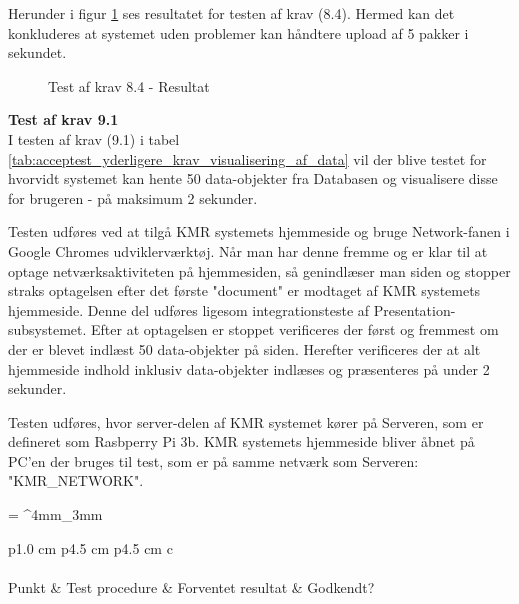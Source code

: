 \begin{appendices}
Herunder i figur \ref{fig:krav_8_4_datadownload} ses resultatet for testen af krav (8.4). Hermed kan det konkluderes at systemet uden problemer kan håndtere upload af 5 pakker i sekundet.

\begin{figure}[H]
	\centering{}
	\caption{Test af krav 8.4 - Resultat}
	\label{fig:krav_8_4_datadownload}
\end{figure}

\pagebreak

\textbf{Test af krav 9.1} \\
I testen af krav (9.1) i tabel \ref{tab:acceptest_yderligere_krav_visualisering_af_data} vil der blive testet for hvorvidt systemet kan hente 50 data-objekter fra Databasen og visualisere disse for brugeren - på maksimum 2 sekunder. \newline

Testen udføres ved at tilgå KMR systemets hjemmeside og bruge Network-fanen i Google Chromes udviklerværktøj. Når man har denne fremme og er klar til at optage netværksaktiviteten på hjemmesiden, så genindlæser man siden og stopper straks optagelsen efter det første "document" er modtaget af KMR systemets hjemmeside. Denne del udføres ligesom integrationsteste af Presentation-subsystemet.
Efter at optagelsen er stoppet verificeres der først og fremmest om der er blevet indlæst 50 data-objekter på siden. Herefter verificeres der at alt hjemmeside indhold inklusiv data-objekter indlæses og præsenteres på under 2 sekunder.

Testen udføres, hvor server-delen af KMR systemet kører på Serveren, som er defineret som Rasbperry Pi 3b. KMR systemets hjemmeside bliver åbnet på PC'en der bruges til test, som er på samme netværk som Serveren: "KMR\_NETWORK".


\begin{table}[H]
	\renewcommand{\arraystretch}{2}
	\centering
	\sffamily
	\small
	\tabulinesep = ^4mm_3mm
	\begin{tabu}{ p{1.0 cm}  p{4.5 cm}   p{4.5 cm}   c  }
		 \\
		 \\
		\kravHeaderStyle
		Punkt & Test procedure & Forventet resultat & Godkendt?\\
		

\end{tabu}
\end{table}
\end{appendices}
